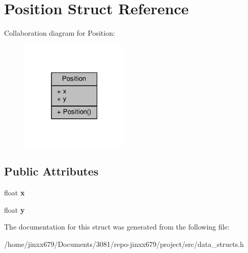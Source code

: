 \hypertarget{structPosition}{}\section{Position Struct Reference}
\label{structPosition}


Collaboration diagram for Position\+:\nopagebreak
\begin{figure}[H]
\begin{center}
\leavevmode
\includegraphics[width=147pt]{structPosition__coll__graph}
\end{center}
\end{figure}
\subsection*{Public Attributes}
\begin{DoxyCompactItemize}
\item 
\mbox{\label{structPosition_af684446cbf0f6d53386686283da6dcc6}} 
float {\bfseries x}
\item 
\mbox{\label{structPosition_a54a6182b5f7539295b32255808897d3f}} 
float {\bfseries y}
\end{DoxyCompactItemize}


The documentation for this struct was generated from the following file\+:\begin{DoxyCompactItemize}
\item 
/home/jinxx679/\+Documents/3081/repo-\/jinxx679/project/src/data\+\_\+structs.\+h\end{DoxyCompactItemize}
